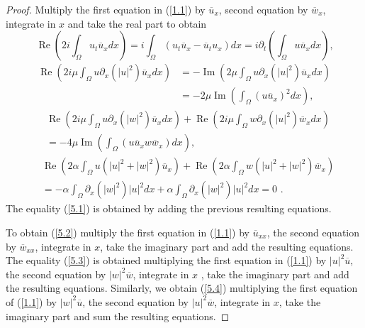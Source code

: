 \documentclass[reqno]{amsart}
\numberwithin{equation}{section}
\begin{document}
\begin{proof}
Multiply the first equation in (\ref{1.1}) by $\overline{u}_{x}$,
second equation by $\overline{w}_{x}$, integrate in $x$ and take
the real part to obtain
\[
\operatorname{Re}\left(
2i\int_{\Omega}u_{t}\overline{u}_{x}dx\right)
=i\int_{\Omega}(u_{t}\overline{u}_{x}-\overline{u}_{t}u_{x})dx=i\partial
_{t}\left(  \int_{\Omega}u\overline{u}_{x}dx\right)  \text{,}\]\begin{align*}
\operatorname{Re}\left(  2i\mu\int_{\Omega}u\partial_{x}(| u|
^{2})\overline{u}_{x}dx\right)   & =-\operatorname{Im}\left(
2\mu\int_{\Omega}u\partial_{x}(| u| ^{2})\overline{u}_{x}dx\right) \\
&  =-2\mu\operatorname{Im}\left(  \int_{\Omega}\left(  u\overline{u}_{x}\right)  ^{2}dx\right)  \text{,}\end{align*}\begin{align*}
&  \operatorname{Re}\left( 2i\mu\int_{\Omega}u\partial_{x}(| w|
^{2})\overline{u}_{x}dx\right)  +\operatorname{Re}\left(
2i\mu\int_{\Omega}w\partial_{x}(| u| ^{2})\overline{w}_{x}dx\right) \\
&  =-4\mu\operatorname{Im}\left(
\int_{\Omega}(u\overline{u}_{x}w\overline
{w}_{x})dx\right)  \text{,}
\end{align*}
\begin{align*}
&  \operatorname{Re}\left(  2\alpha\int_{\Omega}u(| u|
^{2}+| w| ^{2})\overline{u}_{x}\right)  +\operatorname{Re}\left(  2\alpha\int_{\Omega}w(| u| ^{2}+|
w| ^{2})\overline{w}_{x}\right) \\
&   =-\alpha\int_{\Omega}\partial_{x}(| w| ^{2})| u| ^{2}dx\text{
}+\alpha\int_{\Omega}\partial_{x}(|
w| ^{2})| u| ^{2}dx=0\text{ .}\end{align*}
The equality (\ref{5.1}) is obtained by adding the previous resulting equations.

To obtain (\ref{5.2}) multiply the first equation in (\ref{1.1})
by $\overline{u}_{xx}$, the second equation by $\overline
{w}_{xx}$, integrate in $x$, take the imaginary part and add the
resulting equations. The equality (\ref{5.3}) is obtained
multiplying the first equation in (\ref{1.1}) by $| u|
^{2}\overline{u}$, the second equation by $| w| ^{2}\overline{w}$,
integrate in $x$ , take the imaginary part and add the resulting
equations. Similarly, we obtain (\ref{5.4}) multiplying the first
equation of (\ref{1.1}) by $| w| ^{2}\overline{u}$, the second
equation by $| u| ^{2}\overline{w}$, integrate in $x$, take the
imaginary part and sum the resulting equations.

\end{proof}
\end{document}
